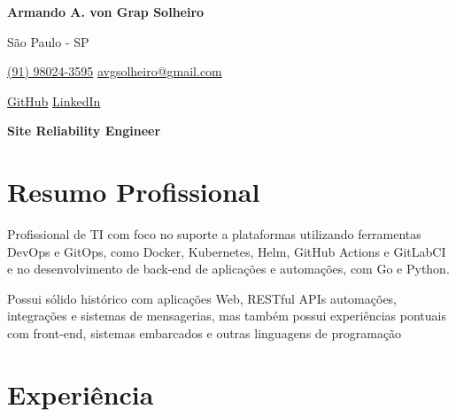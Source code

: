 \documentclass[a4paper,10pt]{article}
\begin{document}

\noindent
\begin{minipage}[t]{0.5\textwidth}
\textbf{\Large Armando A. von Grap Solheiro}

\vspace{0.4em}

\end{minipage}%
\begin{minipage}[t]{0.5\textwidth}
\raggedleft

São Paulo - SP

{\color{blue}} \href{tel:+5591980243595}{\faPhone \space (91) 98024-3595}
{\color{blue}} \href{mailto:avgsolheiro@gmail.com}{\faEnvelope \space avgsolheiro@gmail.com}

\vspace{0.2em}
 \quad
{\color{blue}} \href{https://github.com/asolheiro}{\faGithub \space GitHub} \quad
{\color{blue}} \href{https://www.linkedin.com/in/armandosolheiro/}{\faLinkedin \space LinkedIn} \\
\end{minipage}

\vspace{1em}

\begin{center}
    \textbf{\Large Site Reliability Engineer}
\end{center}
\vspace{0.5em}

\section*{Resumo Profissional}

Profissional de TI com foco no suporte a plataformas utilizando ferramentas DevOps e GitOps, como Docker, Kubernetes, Helm,  GitHub Actions e GitLabCI e no desenvolvimento de back-end de aplicações e automações, com Go e Python.

Possui sólido histórico com aplicações Web, RESTful APIs automações, integrações e sistemas de mensagerias, mas também possui experiências pontuais com front-end, sistemas embarcados e outras linguagens de programação



\vspace{0.6em}

\vspace{0.5em}

\section*{Experiência}
\end{document}
